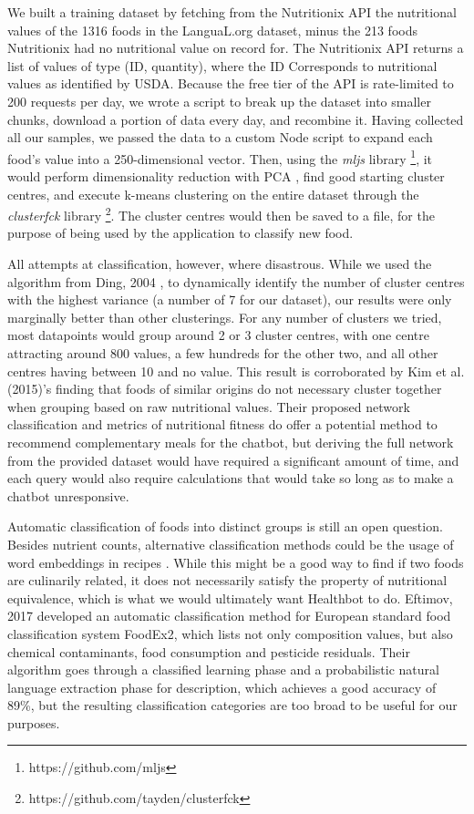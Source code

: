 We built a training dataset by fetching from the Nutritionix API the nutritional values of the 1316 foods in the LanguaL.org dataset, minus the 213 foods Nutritionix had no nutritional value on record for. The Nutritionix API returns a list of values of type (ID, quantity), where the ID Corresponds to nutritional values as identified by USDA. Because the free tier of the API is rate-limited to 200 requests per day, we wrote a script to break up the dataset into smaller chunks, download a portion of data every day, and recombine it. Having collected all our samples, we passed the data to a custom Node script to expand each food's value into a 250-dimensional vector. Then, using the \textit{mljs} library \footnote{https://github.com/mljs}, it would perform dimensionality reduction with PCA \cite{Ding2004}, find good starting cluster centres, and execute k-means clustering on the entire dataset through the \textit{clusterfck} library \footnote{https://github.com/tayden/clusterfck}. The cluster centres would then be saved to a file, for the purpose of being used by the application to classify new food. 

All attempts at classification, however, where disastrous. While we used the algorithm from Ding, 2004 \cite{Ding2004}, to dynamically identify the number of cluster centres with the highest variance (a number of 7 for our dataset), our results were only marginally better than other clusterings. For any number of clusters we tried, most datapoints would group around 2 or 3 cluster centres, with one centre attracting around 800 values, a few hundreds for the other two, and all other centres having between 10 and no value. This result is corroborated by Kim et al. (2015)\cite{Kim2015a}'s finding that foods of similar origins do not necessary cluster together when grouping based on raw nutritional values. Their proposed network classification and metrics of nutritional fitness do offer a potential method to recommend complementary meals for the chatbot, but deriving the full network from the provided dataset would have required a significant amount of time, and each query would also require calculations that would take so long as to make a chatbot unresponsive.

Automatic classification of foods into distinct groups is still an open question. Besides nutrient counts, alternative classification methods could be the usage of word embeddings in recipes \cite{food2vec}. While this might be a good way to find if two foods are culinarily related, it does not necessarily satisfy the property of nutritional equivalence, which is what we would ultimately want Healthbot to do.
Eftimov, 2017 \cite{Eftimov2017} developed an automatic classification method for European standard food classification system FoodEx2, which lists not only composition values, but also chemical contaminants, food consumption and pesticide residuals. Their algorithm goes through a classified learning phase and a probabilistic natural language extraction phase for description, which achieves a good accuracy of 89\%, but the resulting classification categories are too broad to be useful for our purposes.


